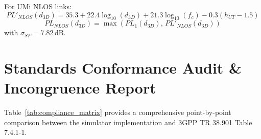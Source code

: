 \documentclass[11pt,a4paper]{article}
\begin{document}
For UMi NLOS links:
\begin{equation}
PL'_{NLOS}(d_{3D}) = 35.3 + 22.4 \log_{10}(d_{3D}) + 21.3 \log_{10}(f_c) - 0.3(h_{UT} - 1.5)
\end{equation}
\begin{equation}
PL_{NLOS}(d_{3D}) = \max\left( PL_1(d_{3D}), \, PL'_{NLOS}(d_{3D}) \right)
\end{equation}
with $\sigma_{SF} = 7.82\,\text{dB}$.

\section{Standards Conformance Audit \& Incongruence Report}

Table~\ref{tab:compliance_matrix} provides a comprehensive point-by-point comparison between the simulator implementation and 3GPP TR 38.901 Table 7.4.1-1.
\end{document}
